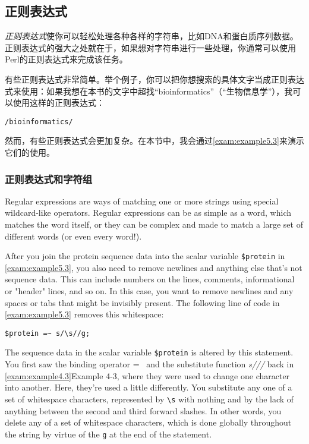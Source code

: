\subsection{正则表达式}
\textit{正则表达式}使你可以轻松处理各种各样的字符串，比如DNA和蛋白质序列数据。正则表达式的强大之处就在于，如果想对字符串进行一些处理，你通常可以使用Perl的正则表达式来完成该任务。

有些正则表达式非常简单。举个例子，你可以把你想搜索的具体文字当成正则表达式来使用：如果我想在本书的文字中超找“bioinformatics”（“生物信息学”），我可以使用这样的正则表达式：

\begin{lstlisting}
/bioinformatics/
\end{lstlisting}

然而，有些正则表达式会更加复杂。在本节中，我会通过\autoref{exam:example5.3}来演示它们的使用。

\subsubsection{正则表达式和字符组}
Regular expressions are ways of matching one or more strings using special wildcard-like operators. Regular expressions can be as simple as a word, which matches the word itself, or they can be complex and made to match a large set of different words (or even every word!).

After you join the protein sequence data into the scalar variable \verb|$protein| in \autoref{exam:example5.3}, you also need to remove newlines and anything else that's not sequence data. This can include numbers on the lines, comments, informational or "header" lines, and so on. In this case, you want to remove newlines and any spaces or tabs that might be invisibly present. The following line of code in \autoref{exam:example5.3} removes this whitespace:

\begin{lstlisting}
$protein =~ s/\s//g;
\end{lstlisting}

The sequence data in the scalar variable \verb|$protein| is altered by this statement. You first saw the binding operator =~ and the substitute function \textit{s///} back in \autoref{exam:example4.3}Example 4-3, where they were used to change one character into another. Here, they're used a little differently. You substitute any one of a set of whitespace characters, represented by \verb|\s| with nothing and by the lack of anything between the second and third forward slashes. In other words, you delete any of a set of whitespace characters, which is done globally throughout the string by virtue of the \verb|g| at the end of the statement.

